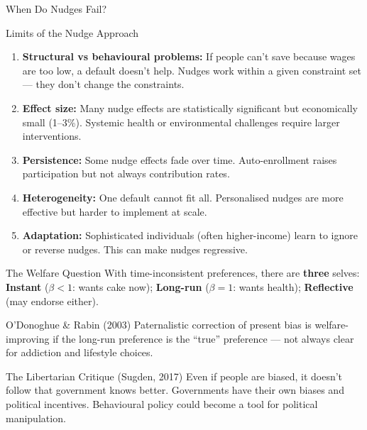 \documentclass[aspectratio=169]{beamer}
\begin{document}
\begin{frame}{When Do Nudges Fail?}
\begin{block}{Limits of the Nudge Approach}
\begin{enumerate}[<+->]
  \item \textbf{Structural vs behavioural problems:} If people can't save because wages are too low, a default doesn't help. Nudges work within a given constraint set --- they don't change the constraints.
  \item \textbf{Effect size:} Many nudge effects are statistically significant but economically small (1--3\%). Systemic health or environmental challenges require larger interventions.
  \item \textbf{Persistence:} Some nudge effects fade over time. Auto-enrollment raises participation but not always contribution rates.
  \item \textbf{Heterogeneity:} One default cannot fit all. Personalised nudges are more effective but harder to implement at scale.
  \item \textbf{Adaptation:} Sophisticated individuals (often higher-income) learn to ignore or reverse nudges. This can make nudges regressive.
\end{enumerate}
\end{block}
\end{frame}

\begin{frame}{The Welfare Question}
With time-inconsistent preferences, there are \textbf{three} selves: \textbf{Instant} ($\beta<1$: wants cake now); \textbf{Long-run} ($\beta=1$: wants health); \textbf{Reflective} (may endorse either).
\begin{exampleblock}{O'Donoghue \& Rabin (2003)}
Paternalistic correction of present bias is welfare-improving if the long-run preference is the ``true'' preference --- not always clear for addiction and lifestyle choices.
\end{exampleblock}
\begin{alertblock}{The Libertarian Critique (Sugden, 2017)}
Even if people are biased, it doesn't follow that government knows better. Governments have their own biases and political incentives. Behavioural policy could become a tool for political manipulation.
\end{alertblock}
\end{frame}
\end{document}
